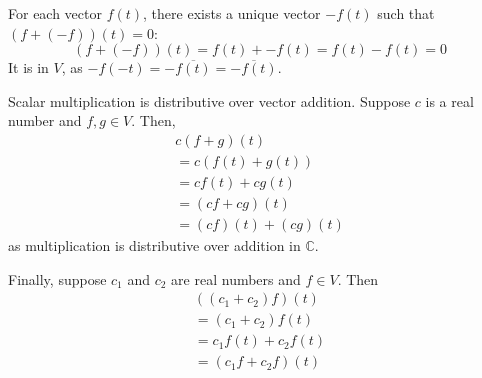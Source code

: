 \documentclass{article}
\begin{document}
\begin{enumerate}[listparindent=\parindent]
    For each vector \(f(t)\), there exists a unique vector \(-f(t)\) such that \((f + (-f))(t) = 0\):
    \[(f + (-f))(t) = f(t) + -f(t) = f(t) - f(t) = 0\]
    It is in \(V\), as \(-f(-t) = -\overline{f(t)} = \overline{-f(t)}\).

    Scalar multiplication is distributive over vector addition. Suppose \(c\) is a real number and \(f, g \in V\). Then,
    \begin{gather*}
        c(f + g)(t) \\
        = c(f(t) + g(t)) \\
        = cf(t) + cg(t) \\
        = (cf + cg)(t) \\
        = (cf)(t) + (cg)(t)
    \end{gather*}
    as multiplication is distributive over addition in \(\mathbb{C}\).

    Finally, suppose \(c_1\) and \(c_2\) are real numbers and \(f \in V\). Then
    \begin{gather*}
        ((c_1 + c_2)f)(t) \\
        = (c_1 + c_2)f(t) \\
        = c_1f(t) + c_2f(t) \\
        = (c_1f + c_2f)(t)
    \end{gather*}
\end{enumerate}
\end{document}

